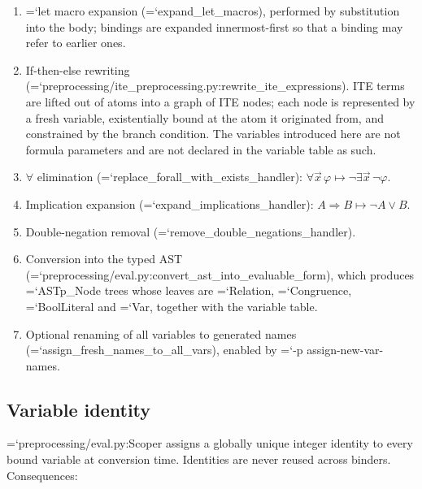 \documentclass[10pt,a4paper]{article}
\newcommand{\code}[1]{{\small\ttfamily\hyphenchar\font=`\-\relax #1}}
\begin{document}
\begin{enumerate}
  \item \code{let} macro expansion (\code{expand\_let\_macros}), performed by substitution into the
        body; bindings are expanded innermost-first so that a binding may refer to earlier ones.
  \item If-then-else rewriting (\code{preprocessing/ite\_\allowbreak preprocessing.py:\allowbreak rewrite\_\allowbreak ite\_\allowbreak expressions}).
        ITE terms are lifted out of atoms into a graph of ITE nodes; each node is represented by a
        fresh variable, existentially bound at the atom it originated from, and constrained by the
        branch condition.  The variables introduced here are not formula parameters and are not
        declared in the variable table as such.
  \item $\forall$ elimination (\code{replace\_\allowbreak forall\_\allowbreak with\_\allowbreak exists\_\allowbreak handler}):
        $\forall \vec{x}\,\varphi \mapsto \neg\exists \vec{x}\,\neg\varphi$.
  \item Implication expansion (\code{expand\_implications\_handler}):
        $A \Rightarrow B \mapsto \neg A \vee B$.
  \item Double-negation removal (\code{remove\_\allowbreak double\_\allowbreak negations\_\allowbreak handler}).
  \item Conversion into the typed AST (\code{preprocessing/eval.py:\allowbreak convert\_\allowbreak ast\_\allowbreak into\_\allowbreak evaluable\_\allowbreak form}),
        which produces \code{ASTp\_Node} trees whose leaves are \code{Relation}, \code{Congruence},
        \code{BoolLiteral} and \code{Var}, together with the variable table.
  \item Optional renaming of all variables to generated names
        (\code{assign\_\allowbreak fresh\_\allowbreak names\_\allowbreak to\_\allowbreak all\_\allowbreak vars}), enabled by \code{-p assign-new-var-names}.
\end{enumerate}

\subsection{Variable identity}

\code{preprocessing/eval.py:\allowbreak Scoper} assigns a globally unique integer identity to every bound
variable at conversion time.  Identities are never reused across binders.  Consequences:
\end{document}
